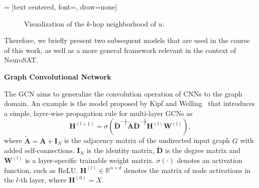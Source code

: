  = [text centered, font=\small, draw=none]
\begin{figure}
    \centering
    \caption[$k$-hop neighborhood visualization]{Visualization of the $k$-hop neighborhood of $u$.}
    \label{fig:k-hop}
\end{figure}

Therefore, we briefly present two subsequent models that are used in the course of this work, as well as a more general framework relevant in the context of NeuroSAT. \bigskip

\textbf{Graph Convolutional Network} \par
The \ac{GCN} aims to generalize the convolution operation of \acp{CNN} to the graph domain. An example is the model proposed by Kipf and Welling~\cite{kipf2016semi} that introduces a simple, layer-wise propagation rule for multi-layer GCNs as
\begin{equation}
    \label{eq:GCN}
    \mathbf{H}^{(l+1)} = \sigma(\tilde{\mathbf{D}}^{-\frac{1}{2}}\tilde{\mathbf{A}}\tilde{\mathbf{D}}^{-\frac{1}{2}}\mathbf{H}^{(l)}\mathbf{W}^{(l)}),
\end{equation}
where $\tilde{\mathbf{A}} = \mathbf{A} + \mathbf{I}_N$ is the adjacency matrix of the undirected input graph $G$ with added self-connections. $\mathbf{I}_N$ is the identity matrix, $\tilde{\mathbf{D}}$ is the degree matrix and $\mathbf{W}^{(l)}$ is a layer-specific trainable weight matrix. $\sigma(\cdot)$ denotes an activation function, such as ReLU. $\mathbf{H}^{(l)} \in \mathbb{R}^{n\times d}$ denotes the matrix of node activations in the $l$-th layer, where $\mathbf{H}^{(0)} = X$. 

